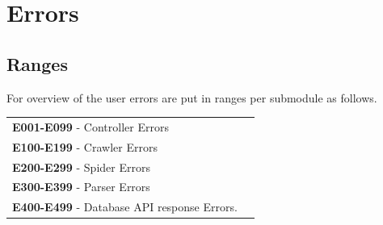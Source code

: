 \documentclass{article}
\begin{document}
\clearpage
\section{Errors}
\subsection{Ranges}
For overview of the user errors are put in ranges per submodule as follows.\\
\begin{tabularx}{\textwidth}{lX} 
    \textbf{E001-E099} - Controller Errors\\
    \textbf{E100-E199} - Crawler Errors\\
    \textbf{E200-E299} - Spider Errors\\
    \textbf{E300-E399} - Parser Errors\\
    \textbf{E400-E499} - Database API response Errors.\\
\end{tabularx}
\end{document}
